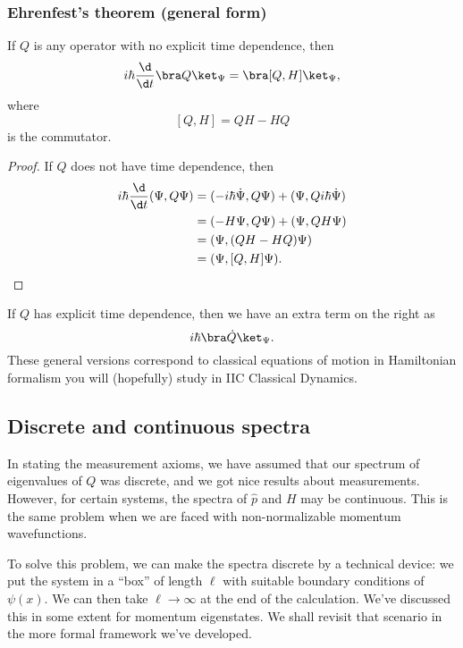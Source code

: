 \documentclass[a4paper]{article}
\begin{document}
\subsubsection*{Ehrenfest's theorem (general form)}
\begin{thm}
  If $Q$ is any operator with no explicit time dependence, then
  \[
    i\hbar \frac{\d}{\d t}\bra Q\ket_\Psi = \bra [Q, H]\ket_\Psi,
  \]
  where
  \[
    [Q, H] = QH - HQ
  \]
  is the commutator.
\end{thm}

\begin{proof}
  If $Q$ does not have time dependence, then
  \begin{align*}
    i\hbar \frac{\d}{\d t}(\Psi, Q\Psi) &= (-i\hbar \dot\Psi, Q\Psi) + (\Psi, Q i\hbar \dot\Psi)\\
    &= (-H\Psi, Q\Psi) + (\Psi, QH \Psi)\\
    &= (\Psi, (QH - HQ)\Psi)\\
    &= (\Psi, [Q, H] \Psi).
  \end{align*}
\end{proof}
If $Q$ has explicit time dependence, then we have an extra term on the right as
\[
  i\hbar \bra \dot{Q} \ket_\Psi.
\]
These general versions correspond to classical equations of motion in Hamiltonian formalism you will (hopefully) study in IIC Classical Dynamics.

\subsection{Discrete and continuous spectra}
In stating the measurement axioms, we have assumed that our spectrum of eigenvalues of $Q$ was discrete, and we got nice results about measurements. However, for certain systems, the spectra of $\hat{p}$ and $H$ may be continuous. This is the same problem when we are faced with non-normalizable momentum wavefunctions.

To solve this problem, we can make the spectra discrete by a technical device: we put the system in a ``box'' of length $\ell$ with suitable boundary conditions of $\psi(x)$. We can then take $\ell \to \infty$ at the end of the calculation. We've discussed this in some extent for momentum eigenstates. We shall revisit that scenario in the more formal framework we've developed.
\end{document}
